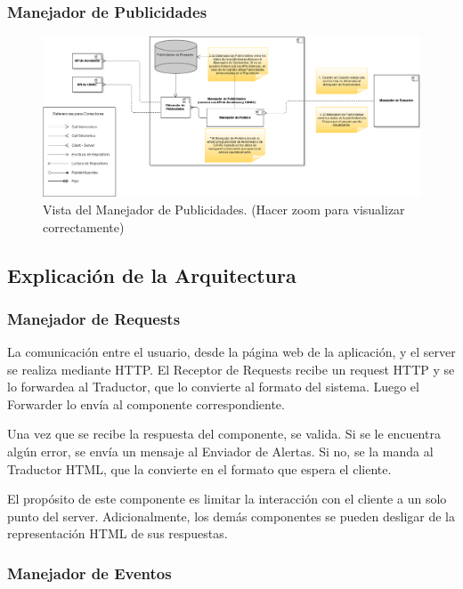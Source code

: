\subsubsection{Manejador de Publicidades}

\begin{figure}[H]
  \centering
  \includegraphics[width=\textwidth]{diagramas/ManejadorDePublicidades.png}
  \caption{\normalfont Vista del Manejador de Publicidades. (Hacer zoom para visualizar correctamente)}
\end{figure} 

\subsection{Explicación de la Arquitectura}

\subsubsection{Manejador de Requests}

La comunicación entre el usuario, desde la página web de la aplicación, y el server se realiza mediante HTTP. El Receptor de Requests recibe un request HTTP y se lo forwardea al Traductor, que lo convierte al formato del sistema. Luego el Forwarder lo envía al componente correspondiente.

Una vez que se recibe la respuesta del componente, se valida. Si se le encuentra algún error, se envía un mensaje al Enviador de Alertas. Si no, se la manda al Traductor HTML, que la convierte en el formato que espera el cliente.

El propósito de este componente es limitar la interacción con el cliente a un solo punto del server. Adicionalmente, los demás componentes se pueden desligar de la representación HTML de sus respuestas.

\subsubsection{Manejador de Eventos}

